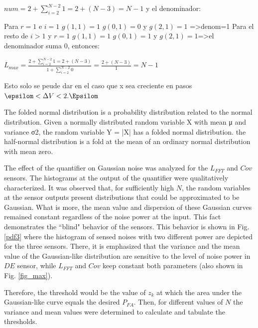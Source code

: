 \documentclass[lettersize,journal]{IEEEtran}
\begin{document}
 $num=2+\sum_{i=2} ^{N-2} 1=2+(N-3)=N-1$
 y el denominador:
 
 Para $r=1$ e $i=1$ $g(1,1)=1$ $g(0,1)=0$ y $g(2,1)=1$ =>denom=1
Para el resto de $i>1$ y $r=1$ $g(1,1)=1$ $g(0,1)=1$ y $g(2,1)=1$=>el denominador suma 0, entonces:

 $L_{max}=\frac{2+\sum_{i=2} ^{N-2} 1=2+(N-3)}{1+\sum_{i=2} ^{N-2} 0}=\frac{2+(N-3)}{1}=N-1$

Esto solo se peude dar en el caso que x sea creciente en pasos $\epsilom < \Delta V < 2.\Epsilom$



The folded normal distribution is a probability distribution related to the normal distribution. Given a normally distributed random variable X with mean μ and variance σ2, the random variable Y = |X| has a folded normal distribution.
the half-normal distribution is a fold at the mean of an ordinary normal distribution with mean zero.\cite{Leone1961}




The effect of the quantifier on Gaussian noise was analyzed for the $L_{FFT}$ and $Cov$ sensors. The histograms at the output of the quantifier were qualitatively characterized. It was observed that, for sufficiently high $N$, the random variables at the sensor outputs present distributions that could be approximated to be Gaussian. What is more, the mean value and dispersion of these Gaussian curves remained constant regardless of the noise power at the input. This fact demonstrates the ``blind" behavior of the sensors. This behavior is shown in Fig. \ref{pdf3} where the histogram of sensed noises with two different power are depicted for the three sensors. There, it is emphasized that the variance and the mean value of the Gaussian-like distribution are sensitive to the level of noise power in $DE$ sensor, while $L_{FFT}$ and $Cov$ keep constant both parameters (also shown in Fig. \ref{fig_max}).


Therefore, the threshold would be the value of $z_k$ at which the area under the Gaussian-like curve equals the desired $P_{FA}$.
Then, for different values of $N$ the variance and mean values were determined to calculate and tabulate the thresholds.
\end{document}
